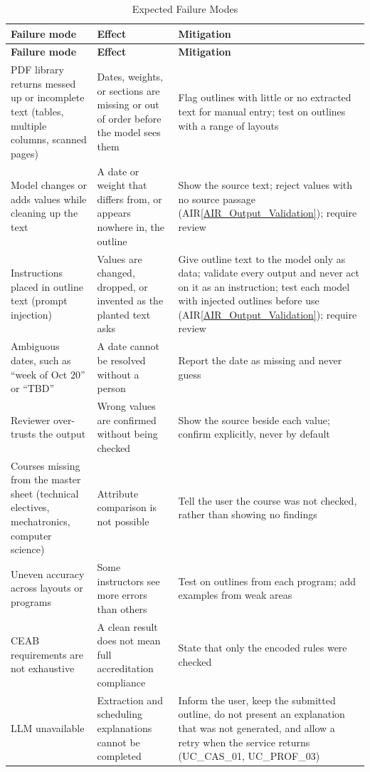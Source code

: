 \documentclass[12pt]{article}
\newcommand{\airref}[1]{AIR\ref{#1}}
\begin{document}
{\small
\renewcommand{\arraystretch}{1.2}
\begin{longtable}{>{\raggedright\arraybackslash}p{} >{\raggedright\arraybackslash}p{} >{\raggedright\arraybackslash}p{}}
\toprule
\textbf{Failure mode} & \textbf{Effect} & \textbf{Mitigation} \\
\midrule
\endfirsthead
\toprule
\textbf{Failure mode} & \textbf{Effect} & \textbf{Mitigation} \\
\midrule
\endhead
\endfoot
\bottomrule
\caption{Expected Failure Modes} \label{tab:ai-limitations}
\endlastfoot
PDF library returns messed up or incomplete text (tables, multiple columns, scanned pages) & Dates, weights, or sections are missing or out of order before the model sees them & Flag outlines with little or no extracted text for manual entry; test on outlines with a range of layouts \\ \addlinespace
Model changes or adds values while cleaning up the text & A date or weight that differs from, or appears nowhere in, the outline & Show the source text; reject values with no source passage (\airref{AIR_Output_Validation}); require review \\ \addlinespace
Instructions placed in outline text (prompt injection) & Values are changed, dropped, or invented as the planted text asks & Give outline text to the model only as data; validate every output and never act on it as an instruction; test each model with injected outlines before use (\airref{AIR_Output_Validation}); require review \\ \addlinespace
Ambiguous dates, such as ``week of Oct 20'' or ``TBD'' & A date cannot be resolved without a person & Report the date as missing and never guess \\ \addlinespace
Reviewer over-trusts the output & Wrong values are confirmed without being checked & Show the source beside each value; confirm explicitly, never by default \\ \addlinespace
Courses missing from the master sheet (technical electives, mechatronics, computer science) & Attribute comparison is not possible & Tell the user the course was not checked, rather than showing no findings \\ \addlinespace
Uneven accuracy across layouts or programs & Some instructors see more errors than others & Test on outlines from each program; add examples from weak areas \\ \addlinespace
CEAB requirements are not exhaustive & A clean result does not mean full accreditation compliance & State that only the encoded rules were checked \\ \addlinespace
LLM unavailable & Extraction and scheduling explanations cannot be completed & Inform the user, keep the submitted outline, do not present an explanation that was not generated, and allow a retry when the service returns (UC\_CAS\_01, UC\_PROF\_03) \\
\end{longtable}
}
\end{document}
